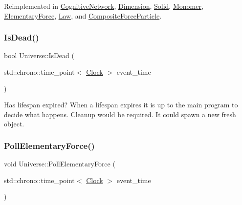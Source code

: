Reimplemented in \mbox{\hyperlink{classCognitiveNetwork_aa6342c390fe8e7c648b4c6bc8f93ba4a}{Cognitive\+Network}}, \mbox{\hyperlink{classDimension_a5bb5a164564013a60728854cc2e5ddb3}{Dimension}}, \mbox{\hyperlink{classSolid_ac98f9c827d58a631627423e25dd611ba}{Solid}}, \mbox{\hyperlink{classMonomer_aec6e42dde40c5b3142fab880eabb346a}{Monomer}}, \mbox{\hyperlink{classElementaryForce_a928e06a1fa81b8d7ec4a426d959a0f98}{Elementary\+Force}}, \mbox{\hyperlink{classLaw_aad6e54da64a5d8499dcb6c232aa6748f}{Law}}, and \mbox{\hyperlink{classCompositeForceParticle_a27762218af4e3c021c89ff4792d81b41}{Composite\+Force\+Particle}}.

\mbox{\label{classUniverse_a8fdaa6d06584e1ef50c4c613b22b786e}} 
\subsubsection{\texorpdfstring{Is\+Dead()}{IsDead()}}
{\footnotesize\ttfamily bool Universe\+::\+Is\+Dead (\begin{DoxyParamCaption}\item[{std\+::chrono\+::time\+\_\+point$<$ \mbox{\hyperlink{universe_8h_a0ef8d951d1ca5ab3cfaf7ab4c7a6fd80}{Clock}} $>$}]{event\+\_\+time }\end{DoxyParamCaption})}

Has lifespan expired? When a lifespan expires it is up to the main program to decide what happens. Cleanup would be required. It could spawn a new fresh object.\mbox{\label{classUniverse_a0c485c504542409cbb5cfd8543c35b11}} 
\subsubsection{\texorpdfstring{Poll\+Elementary\+Force()}{PollElementaryForce()}}
{\footnotesize\ttfamily void Universe\+::\+Poll\+Elementary\+Force (\begin{DoxyParamCaption}\item[{std\+::chrono\+::time\+\_\+point$<$ \mbox{\hyperlink{universe_8h_a0ef8d951d1ca5ab3cfaf7ab4c7a6fd80}{Clock}} $>$}]{event\+\_\+time }\end{DoxyParamCaption})\hspace{0.3cm}{\ttfamily [virtual]}}



